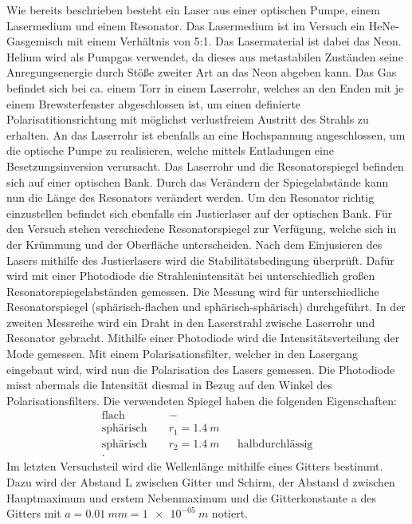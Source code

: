 Wie bereits beschrieben besteht ein Laser aus einer optischen Pumpe, einem Lasermedium und einem Resonator.
Das Lasermedium ist im Versuch ein HeNe-Gasgemisch mit einem Verhältnis von 5:1.
Das Lasermaterial ist dabei das Neon.
Helium wird als Pumpgas verwendet, da dieses aus metastabilen Zuständen seine Anregungsenergie durch Stöße zweiter Art an das Neon abgeben kann.
Das Gas befindet sich bei ca. einem Torr in einem Laserrohr, welches an den Enden mit je einem Brewsterfenster abgeschlossen ist, um einen
definierte Polarisatitionsrichtung mit möglichst verlustfreiem Austritt des Strahls zu erhalten.
An das Laserrohr ist ebenfalls an eine Hochspannung angeschlossen, um die optische Pumpe zu realisieren, welche mittels Entladungen eine Besetzungsinversion verursacht.
Das Laserrohr und die Resonatorspiegel befinden sich auf einer optischen Bank.
Durch das Verändern der Spiegelabstände kann nun die Länge des Resonators verändert werden.
Um den Resonator richtig einzustellen befindet sich ebenfalls ein Justierlaser auf der optischen Bank.
Für den Versuch stehen verschiedene Resonatorspiegel zur Verfügung, welche sich in der Krümmung und der Oberfläche unterscheiden.
Nach dem Einjusieren des Lasers mithilfe des Justierlasers wird die Stabilitätsbedingung überprüft.
Dafür wird mit einer Photodiode die Strahlenintensität bei unterschiedlich großen Resonatorspiegelabständen gemessen.
Die Messung wird für unterschiedliche Resonatorspiegel (sphärisch-flachen und sphärisch-sphärisch) durchgeführt.
In der zweiten Messreihe wird ein Draht in den Laserstrahl zwische Laserrohr und Resonator gebracht.
Mithilfe einer Photodiode wird die Intensitätsverteilung der Mode gemessen.
%
Mit einem Polarisationsfilter, welcher in den Lasergang eingebaut wird, wird nun die Polarisation des Lasers gemessen.
Die Photodiode misst abermals die Intensität diesmal in Bezug auf den Winkel des Polarisationsfilters.
%
Die verwendeten Spiegel haben die folgenden Eigenschaften:
\begin{align*}
\text{flach }      &&       -       && \\
\text{sphärisch }  && r_{1}=\SI{1.4}{m} && \\
\text{sphärisch }  && r_{2}=\SI{1.4}{m} && \text{halbdurchlässig}\\.
\end{align*}
%
Im letzten Versuchsteil wird die Wellenlänge mithilfe eines Gitters bestimmt.
Dazu wird der Abstand L zwischen Gitter und Schirm, der Abstand d zwischen Hauptmaximum und erstem Nebenmaximum und die Gitterkonstante a des Gitters mit $a= \SI{0.01}{mm}=\SI{1e-05}{m}$ notiert.

